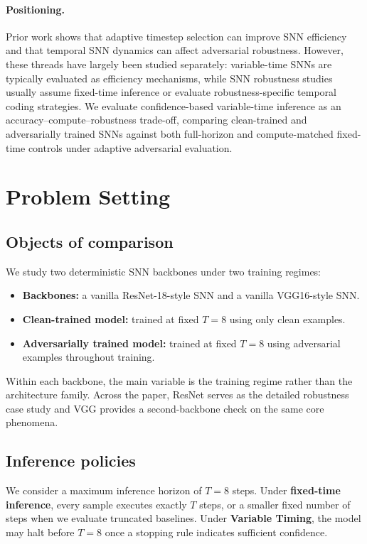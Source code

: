 \documentclass[11pt]{article}
\begin{document}
\paragraph{Positioning.} Prior work shows that adaptive timestep selection can improve SNN efficiency and that temporal SNN dynamics can affect adversarial robustness. However, these threads have largely been studied separately: variable-time SNNs are typically evaluated as efficiency mechanisms, while SNN robustness studies usually assume fixed-time inference or evaluate robustness-specific temporal coding strategies. We evaluate confidence-based variable-time inference as an accuracy--compute--robustness trade-off, comparing clean-trained and adversarially trained SNNs against both full-horizon and compute-matched fixed-time controls under adaptive adversarial evaluation.

\section{Problem Setting}
\subsection{Objects of comparison}
We study two deterministic SNN backbones under two training regimes:
\begin{itemize}[leftmargin=1.3em]
\item \textbf{Backbones:} a vanilla ResNet-18-style SNN and a vanilla VGG16-style SNN.
\item \textbf{Clean-trained model:} trained at fixed $T=8$ using only clean examples.
\item \textbf{Adversarially trained model:} trained at fixed $T=8$ using adversarial examples throughout training.
\end{itemize}
Within each backbone, the main variable is the training regime rather than the architecture family. Across the paper, ResNet serves as the detailed robustness case study and VGG provides a second-backbone check on the same core phenomena.

\subsection{Inference policies}
We consider a maximum inference horizon of $T=8$ steps. Under \textbf{fixed-time inference}, every sample executes exactly $T$ steps, or a smaller fixed number of steps when we evaluate truncated baselines. Under \textbf{Variable Timing}, the model may halt before $T=8$ once a stopping rule indicates sufficient confidence.
\end{document}
